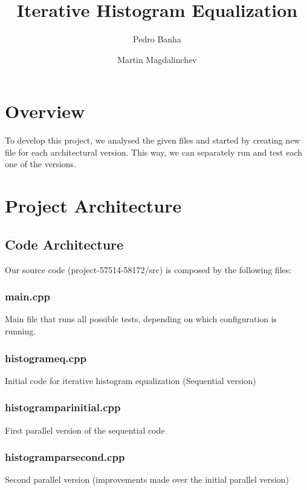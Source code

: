 \documentclass[sigconf]{acmart}
\begin{document}
\title{Iterative Histogram Equalization}

\author{Pedro Banha}

\author{Martin Magdalinchev}

\maketitle

\section{Overview}
To develop this project, we analysed the given files and started by creating new file for each architectural version. This way, we can separately run and test each one of the versions. 
\section{Project Architecture}

\subsection{Code Architecture}
Our source code (project-57514-58172/src) is composed by the following files:

\subsubsection{main.cpp}
Main file that runs all possible tests, depending on which configuration is running.

\subsubsection{histogram\textunderscore eq.cpp}
Initial code for iterative histogram equalization (Sequential version)

\subsubsection{histogram\textunderscore par\textunderscore initial.cpp}
First parallel version of the sequential code

\subsubsection{histogram\textunderscore par\textunderscore second.cpp}
Second parallel version (improvements made over the initial parallel version)
\end{document}
